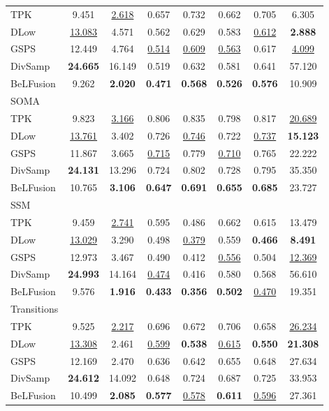 \documentclass[10pt,twocolumn,letterpaper]{article}
\begin{document}
\begin{table}[t!]
\begin{tabular}{lccccccc@{\hskip 2mm}}
\midrule
TPK & 9.451 & \underline{2.618} & 0.657 & 0.732 & 0.662 & 0.705 & 6.305\\
DLow & \underline{13.083} & 4.571 & 0.562 & 0.629 & 0.583 & \underline{0.612} & \textbf{2.888}\\
GSPS & 12.449 & 4.764 & \underline{0.514} & \underline{0.609} & \underline{0.563} & 0.617 & \underline{4.099}\\
DivSamp & \textbf{24.665} & 16.149 & 0.519 & 0.632 & 0.581 & 0.641 & 57.120\\
BeLFusion & 9.262 & \textbf{2.020} & \textbf{0.471} & \textbf{0.568} & \textbf{0.526} & \textbf{0.576} & 10.909\\
\midrule
SOMA \\
\midrule
TPK & 9.823 & \underline{3.166} & 0.806 & 0.835 & 0.798 & 0.817 & \underline{20.689}\\
DLow & \underline{13.761} & 3.402 & 0.726 & \underline{0.746} & 0.722 & \underline{0.737} & \textbf{15.123}\\
GSPS & 11.867 & 3.665 & \underline{0.715} & 0.779 & \underline{0.710} & 0.765 & 22.222\\
DivSamp & \textbf{24.131} & 13.296 & 0.724 & 0.802 & 0.728 & 0.795 & 35.350\\
BeLFusion & 10.765 & \textbf{3.106} & \textbf{0.647} & \textbf{0.691} & \textbf{0.655} & \textbf{0.685} & 23.727\\
\midrule
SSM \\
\midrule
TPK & 9.459 & \underline{2.741} & 0.595 & 0.486 & 0.662 & 0.615 & 13.479\\
DLow & \underline{13.029} & 3.290 & 0.498 & \underline{0.379} & 0.559 & \textbf{0.466} & \textbf{8.491}\\
GSPS & 12.973 & 3.467 & 0.490 & 0.412 & \underline{0.556} & 0.504 & \underline{12.369}\\
DivSamp & \textbf{24.993} & 14.164 & \underline{0.474} & 0.416 & 0.580 & 0.568 & 56.610\\
BeLFusion & 9.576 & \textbf{1.916} & \textbf{0.433} & \textbf{0.356} & \textbf{0.502} & \underline{0.470} & 19.351\\
\midrule
Transitions \\
\midrule
TPK & 9.525 & \underline{2.217} & 0.696 & 0.672 & 0.706 & 0.658 & \underline{26.234}\\
DLow & \underline{13.308} & 2.461 & \underline{0.599} & \textbf{0.538} & \underline{0.615} & \textbf{0.550} & \textbf{21.308}\\
GSPS & 12.169 & 2.470 & 0.636 & 0.642 & 0.655 & 0.648 & 27.634\\
DivSamp & \textbf{24.612} & 14.092 & 0.648 & 0.724 & 0.687 & 0.725 & 33.953\\
BeLFusion & 10.499 & \textbf{2.085} & \textbf{0.577} & \underline{0.578} & \textbf{0.611} & \underline{0.596} & 27.361\\


\end{tabular}
\end{table}
\end{document}
